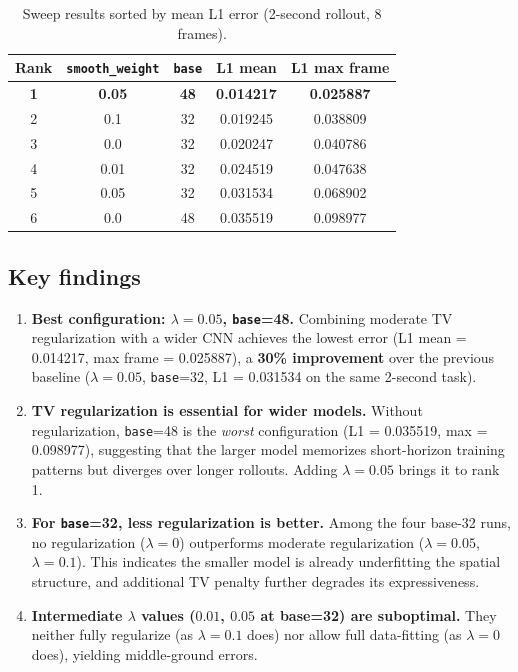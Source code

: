 \documentclass[11pt,a4paper]{article}
\begin{document}
\begin{table}[H]
  \centering
  \caption{Sweep results sorted by mean L1 error (2-second rollout, 8 frames).}
  \label{tab:results}
  \begin{tabular}{ccccc}
    \toprule
    Rank & \texttt{smooth\_weight} & \texttt{base} & L1 mean & L1 max frame \\
    \midrule
    \textbf{1} & \textbf{0.05} & \textbf{48} & \textbf{0.014217} & \textbf{0.025887} \\
    2 & 0.1  & 32 & 0.019245 & 0.038809 \\
    3 & 0.0  & 32 & 0.020247 & 0.040786 \\
    4 & 0.01 & 32 & 0.024519 & 0.047638 \\
    5 & 0.05 & 32 & 0.031534 & 0.068902 \\
    6 & 0.0  & 48 & 0.035519 & 0.098977 \\
    \bottomrule
  \end{tabular}
\end{table}

\subsection{Key findings}

\begin{enumerate}
  \item \textbf{Best configuration: $\lambda=0.05$, \texttt{base}=48.}
    Combining moderate TV regularization with a wider CNN achieves the lowest error
    (L1 mean = 0.014217, max frame = 0.025887),
    a \textbf{30\% improvement} over the previous baseline ($\lambda=0.05$, \texttt{base}=32, L1 = 0.031534 on the same 2-second task).

  \item \textbf{TV regularization is essential for wider models.}
    Without regularization, \texttt{base}=48 is the \emph{worst} configuration (L1 = 0.035519, max = 0.098977),
    suggesting that the larger model memorizes short-horizon training patterns but diverges
    over longer rollouts. Adding $\lambda=0.05$ brings it to rank 1.

  \item \textbf{For \texttt{base}=32, less regularization is better.}
    Among the four base-32 runs, no regularization ($\lambda=0$) outperforms
    moderate regularization ($\lambda=0.05$, $\lambda=0.1$).
    This indicates the smaller model is already underfitting the spatial structure,
    and additional TV penalty further degrades its expressiveness.

  \item \textbf{Intermediate $\lambda$ values ($0.01$, $0.05$ at base=32) are suboptimal.}
    They neither fully regularize (as $\lambda=0.1$ does) nor allow full data-fitting
    (as $\lambda=0$ does), yielding middle-ground errors.
\end{enumerate}
\end{document}
